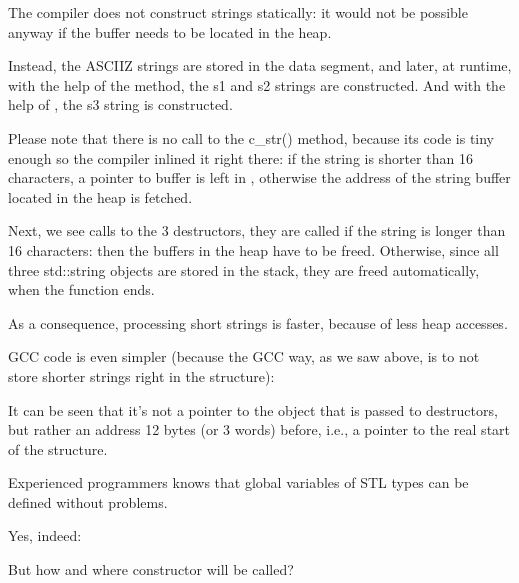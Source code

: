 




The compiler does not construct strings statically: it would not be possible anyway if the buffer needs to be located
in the \gls{heap}.

Instead, the \ac{ASCIIZ} strings are stored in the data segment, and later, at runtime,
with the help of the  method, the s1 and s2 strings are constructed.
And with the help of , the s3 string is constructed.

Please note that 
there is no call to the c\_str() method, because its code is tiny enough so the compiler
inlined it right there: if the string is shorter than 16 characters, a pointer to buffer is left
in \EAX, otherwise the address of the string buffer located in the \gls{heap} is fetched.

Next, we see calls to the 3 destructors, they are called if
the string is longer than 16 characters: then the buffers in the \gls{heap} have to be freed.
Otherwise, since all three std::string objects
are stored in the stack, they are freed automatically, when the function ends.

As a consequence, processing short strings is faster, because of less \gls{heap} accesses.

GCC code is even simpler (because the GCC way, as we saw above, is to not store
shorter strings right in the structure):



It can be seen that it's not a pointer to the object that is passed to destructors, but rather an address 12 bytes (or 3 words)
before, i.e., a pointer to the real start of the structure.

\label{sec:std_string_as_global_variable}

Experienced \Cpp programmers knows that global variables of \ac{STL} types can be defined without problems.

Yes, indeed:



But how and where  constructor will be called?

